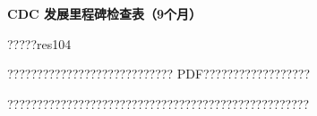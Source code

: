 \documentclass[11pt]{article}
\begin{document}
{\color[HTML]{0A84FF}\LARGE\bfseries CDC 发展里程碑检查表（9个月）\par}
{\color[HTML]{667085}\small ?????res104\par}
\vspace{1em}
???????????????????????????? PDF??????????????????

???????????????????????????????????????????????????
\end{document}
